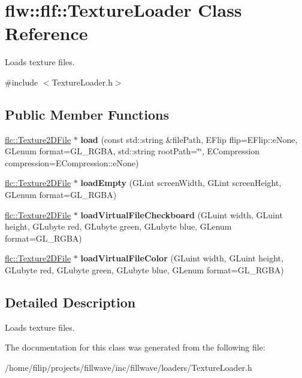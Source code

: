 \hypertarget{classflw_1_1flf_1_1TextureLoader}{}\section{flw\+:\+:flf\+:\+:Texture\+Loader Class Reference}
\label{classflw_1_1flf_1_1TextureLoader}


Loads texture files.  




{\ttfamily \#include $<$Texture\+Loader.\+h$>$}

\subsection*{Public Member Functions}
\begin{DoxyCompactItemize}
\item 
\mbox{\label{classflw_1_1flf_1_1TextureLoader_a4aef85c4d19601d6ed7dff51b6df3134}} 
\hyperlink{classflw_1_1flc_1_1Texture2DFile}{flc\+::\+Texture2\+D\+File} $\ast$ {\bfseries load} (const std\+::string \&file\+Path, E\+Flip flip=E\+Flip\+::e\+None, G\+Lenum format=G\+L\+\_\+\+R\+G\+BA, std\+::string root\+Path=\char`\"{}\char`\"{}, E\+Compression compression=E\+Compression\+::e\+None)
\item 
\mbox{\label{classflw_1_1flf_1_1TextureLoader_abcbf6f3ab22585c88828d90568bb77ad}} 
\hyperlink{classflw_1_1flc_1_1Texture2DFile}{flc\+::\+Texture2\+D\+File} $\ast$ {\bfseries load\+Empty} (G\+Lint screen\+Width, G\+Lint screen\+Height, G\+Lenum format=G\+L\+\_\+\+R\+G\+BA)
\item 
\mbox{\label{classflw_1_1flf_1_1TextureLoader_afb9175c84f0289a3f4b580bac7254086}} 
\hyperlink{classflw_1_1flc_1_1Texture2DFile}{flc\+::\+Texture2\+D\+File} $\ast$ {\bfseries load\+Virtual\+File\+Checkboard} (G\+Luint width, G\+Luint height, G\+Lubyte red, G\+Lubyte green, G\+Lubyte blue, G\+Lenum format=G\+L\+\_\+\+R\+G\+BA)
\item 
\mbox{\label{classflw_1_1flf_1_1TextureLoader_a0c68b9c45e42d3339f96587edcd0def4}} 
\hyperlink{classflw_1_1flc_1_1Texture2DFile}{flc\+::\+Texture2\+D\+File} $\ast$ {\bfseries load\+Virtual\+File\+Color} (G\+Luint width, G\+Luint height, G\+Lubyte red, G\+Lubyte green, G\+Lubyte blue, G\+Lenum format=G\+L\+\_\+\+R\+G\+BA)
\end{DoxyCompactItemize}


\subsection{Detailed Description}
Loads texture files. 

The documentation for this class was generated from the following file\+:\begin{DoxyCompactItemize}
\item 
/home/filip/projects/fillwave/inc/fillwave/loaders/Texture\+Loader.\+h\end{DoxyCompactItemize}
